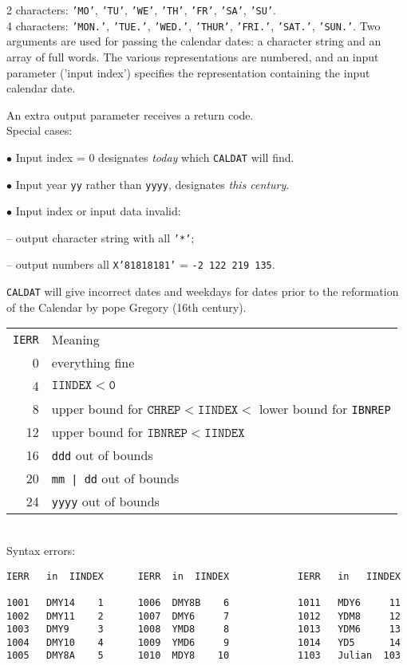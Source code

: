 2 characters:
{\tt 'MO'}, {\tt 'TU'}, {\tt 'WE'}, {\tt 'TH'}, {\tt 'FR'},
{\tt 'SA'}, {\tt 'SU'}.  \\[1mm]
4 characters:
{\tt 'MON.'}, {\tt 'TUE.'}, {\tt 'WED.'}, {\tt 'THUR'}, {\tt 'FRI.'},
{\tt 'SAT.'}, {\tt 'SUN.'}.
\Method
Two arguments are used for passing the calendar dates: a character
string and an array of full words. The various representations are
numbered, and an input parameter ('input index') specifies the
representation containing the input calendar date.
\par
An extra output parameter receives a return code. \\[2mm]
Special cases:
\begin{DLtt}{12}
\item[$\bullet$]  Input index = 0 designates {\it today} which
{\tt CALDAT} will find.
\item[$\bullet$]  Input year {\tt yy} rather than {\tt yyyy},
designates {\it this century}.
\item[$\bullet$]  Input index or input data invalid:
\item[] -- output character string with all {\tt '*'};
\item[] -- output numbers all {\tt X'81818181'} = {\tt -2 122 219 135}.
\end{DLtt}
\newpage
\Restrict
{\tt CALDAT} will give incorrect dates and weekdays for dates prior to
the reformation of the Calendar by pope Gregory (16th century).
\Errorh
\begin{tabular}{@{\hspace*{15mm}}rl}
{\tt IERR} & Meaning \\[1mm]
 0 & everything fine  \\
 4 & $\mathtt{IINDEX < 0}$ \\
 8 & upper bound for $\mathtt{CHREP < IINDEX <}$ lower bound for
     {\tt IBNREP} \\
12 & upper bound for $\mathtt{IBNREP < IINDEX}$ \\
16 & {\tt ddd}  out of bounds \\
20 & {\tt mm | dd} out of bounds \\
24 & {\tt yyyy} out of bounds
\end{tabular} \\[2mm]
Syntax errors:
\begin{verbatim}
IERR   in  IINDEX      IERR  in  IINDEX            IERR   in   IINDEX
 
1001   DMY14    1      1006  DMY8B    6            1011   MDY6     11
1002   DMY11    2      1007  DMY6     7            1012   YDM8     12
1003   DMY9     3      1008  YMD8     8            1013   YDM6     13
1004   DMY10    4      1009  YMD6     9            1014   YD5      14
1005   DMY8A    5      1010  MDY8    10            1103   Julian  103
\end{verbatim}
